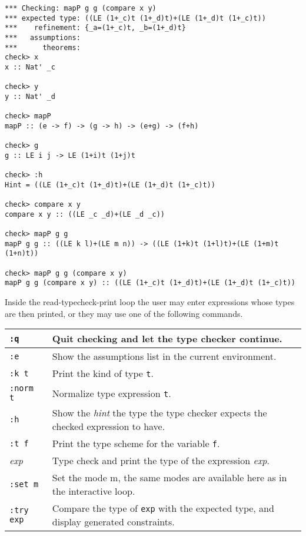 \documentclass[11pt,twoside]{article}
\begin{document}
\begin{verbatim}
*** Checking: mapP g g (compare x y)
*** expected type: ((LE (1+_c)t (1+_d)t)+(LE (1+_d)t (1+_c)t))
***    refinement: {_a=(1+_c)t, _b=(1+_d)t}
***   assumptions:
***      theorems:
check> x
x :: Nat' _c

check> y
y :: Nat' _d

check> mapP
mapP :: (e -> f) -> (g -> h) -> (e+g) -> (f+h)

check> g
g :: LE i j -> LE (1+i)t (1+j)t

check> :h
Hint = ((LE (1+_c)t (1+_d)t)+(LE (1+_d)t (1+_c)t))

check> compare x y
compare x y :: ((LE _c _d)+(LE _d _c))

check> mapP g g
mapP g g :: ((LE k l)+(LE m n)) -> ((LE (1+k)t (1+l)t)+(LE (1+m)t (1+n)t))

check> mapP g g (compare x y)
mapP g g (compare x y) :: ((LE (1+_c)t (1+_d)t)+(LE (1+_d)t (1+_c)t))
\end{verbatim}
Inside the read-typecheck-print loop the user may enter expressions whose
types are then printed, or they may use one of the following commands.

\vspace*{.2in}

\begin{tabular}{|l|l|}\hline
{\tt :q} &  Quit checking and let the type checker continue. \\ \hline
{\tt :e} & Show the assumptions list in the current environment. \\ \hline
{\tt :k t} & Print the kind of type {\tt t}. \\ \hline
{\tt :norm t} & Normalize type expression {\tt t}. \\ \hline
{\tt :h} & Show the {\em hint} the type the type checker expects the checked expression to have. \\ \hline
{\tt :t f} & Print the type scheme for the variable {\tt f}.\\ \hline
{\em exp} & Type check and print the type of the expression {\em exp}.\\ \hline
{\tt :set m} & Set the mode m, the same modes are available here as in the interactive loop. \\ \hline
{\tt :try exp} & Compare the type of {\tt exp} with the expected type, and display generated constraints. \\ \hline
\end{tabular}

\vspace*{.2in}
\end{document}
